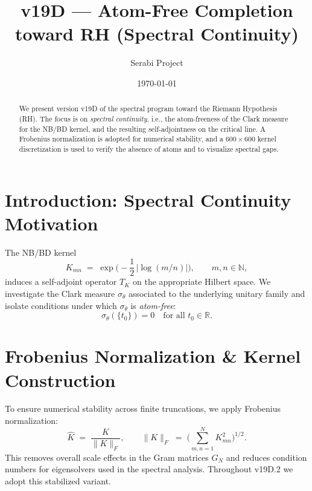 \documentclass[11pt]{article}
\title{v19D --- Atom-Free Completion toward RH (Spectral Continuity)}
\author{Serabi Project}
\date{\today}
\begin{document}
\maketitle

\begin{abstract}
We present version v19D of the spectral program toward the Riemann Hypothesis (RH).
The focus is on \emph{spectral continuity}, i.e., the atom-freeness of the Clark measure for the NB/BD kernel,
and the resulting self-adjointness on the critical line. A Frobenius normalization is adopted
for numerical stability, and a $600\times 600$ kernel discretization is used to verify the
absence of atoms and to visualize spectral gaps.
\end{abstract}

\section{Introduction: Spectral Continuity Motivation}
The NB/BD kernel
\begin{equation}\label{eq:kernel}
K_{mn} \;=\; \exp\!\Big(-\frac{1}{2}\,\big|\log(m/n)\big|\Big),
\qquad m,n\in\mathbb{N},
\end{equation}
induces a self-adjoint operator $T_K$ on the appropriate Hilbert space.
We investigate the Clark measure $\sigma_\theta$ associated to the underlying unitary family
and isolate conditions under which $\sigma_\theta$ is \emph{atom-free}:
\begin{equation}\label{eq:atomfree}
\sigma_\theta(\{t_0\}) = 0 \quad \text{for all } t_0\in\mathbb{R}.
\end{equation}

\section{Frobenius Normalization \& Kernel Construction}
To ensure numerical stability across finite truncations, we apply Frobenius normalization:
\begin{equation}
\widehat{K} \;=\; \frac{K}{\|K\|_F}, \qquad
\|K\|_F \;=\; \bigg(\sum_{m,n=1}^N K_{mn}^2\bigg)^{1/2}.
\end{equation}
This removes overall scale effects in the Gram matrices $G_N$ and reduces condition numbers
for eigensolvers used in the spectral analysis. Throughout v19D.2 we adopt this stabilized variant.
\end{document}
